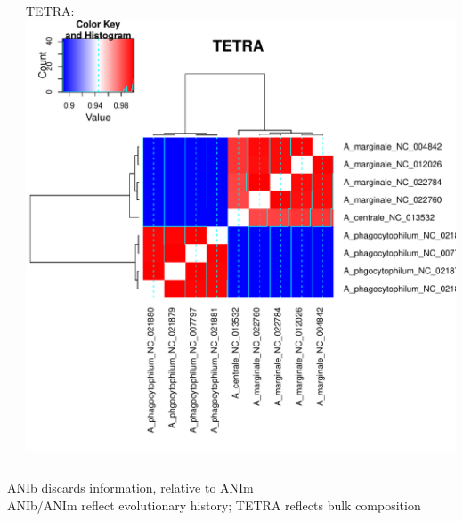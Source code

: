 \begin{frame}
\begin{columns}[T]
\begin{column}{4cm}
    \end{column}
    \begin{column}{4cm}   
    TETRA:\\
      \includegraphics[width=1\textwidth]{images/TETRA}
    \end{column}
  \end{columns}       
  ANIb discards information, relative to ANIm\\
  ANIb/ANIm reflect evolutionary history; TETRA reflects bulk composition
\end{frame}

